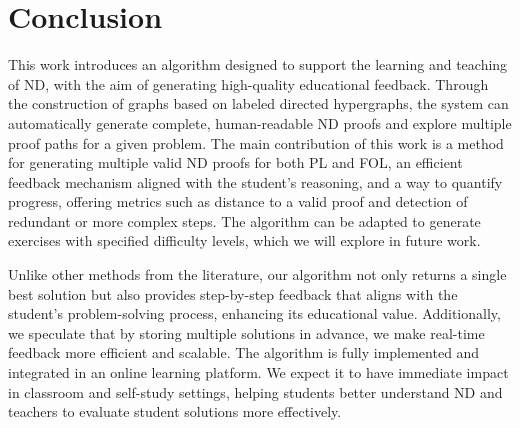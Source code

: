 \section{Conclusion}
This work introduces an algorithm designed to support the learning and teaching of ND, with the aim of generating high-quality educational feedback. Through the construction of graphs based on labeled directed hypergraphs, the system can automatically generate complete, human-readable ND proofs and explore multiple proof paths for a given problem.
The main contribution of this work is a method for generating multiple valid ND proofs for both PL and FOL, an efficient feedback mechanism aligned with the student’s reasoning, and a way to quantify progress, offering metrics such as distance to a valid proof and detection of redundant or more complex steps. The algorithm can be adapted to generate exercises with specified difficulty levels, which we will explore in future work.

Unlike other methods from the literature, our algorithm not only returns a single best solution but also provides step-by-step feedback that aligns with the student’s problem-solving process, enhancing its educational value. Additionally, we speculate that by storing multiple solutions in advance, we make real-time feedback more efficient and scalable.
%
The algorithm is fully implemented and integrated in an online learning platform. We expect it to have immediate impact in classroom and self-study settings, helping students better understand ND and teachers to evaluate student solutions more effectively.
